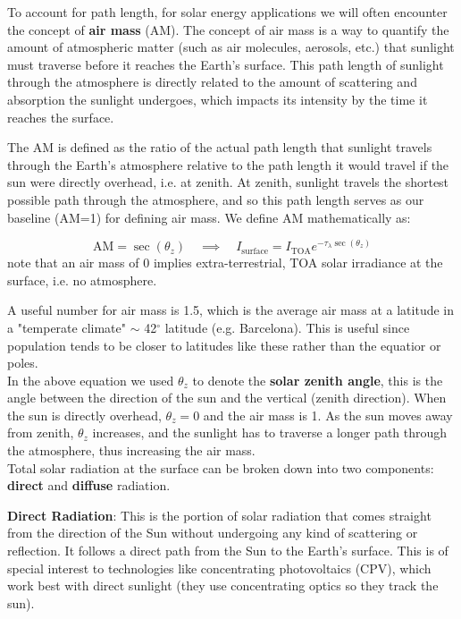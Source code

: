 \noindent To account for path length, for solar energy applications we will often
encounter the concept of \textbf{air mass} (AM). The concept of air mass is a way to
quantify the amount of atmospheric matter (such as air molecules, aerosols, etc.)
that sunlight must traverse before it reaches the Earth's surface.
This path length of sunlight through the atmosphere is directly related to the 
amount of scattering and absorption the sunlight undergoes, which impacts its 
intensity by the time it reaches the surface.

The AM is defined as the ratio of the actual path length that sunlight travels 
through the Earth's atmosphere relative to the path length it would travel if 
the sun were directly overhead, i.e. at zenith. At zenith, sunlight travels the
shortest possible path through the atmosphere, and so this path length serves 
as our baseline (AM=1) for defining air mass. We define AM mathematically as:

$$
\boxed{
    \text{AM} = \sec (\theta_z) \quad \implies \quad I_{\text{surface}} =
    I_{\text{TOA}} e^{-\tau_\lambda \sec (\theta_z)}
}
$$
note that an air mass of 0 implies extra-terrestrial, \gls{TOA} solar irradiance
at the surface, i.e. no atmosphere.

\noindent A useful number for air mass is 1.5, which is the average air mass
at a latitude in a "temperate climate" $\sim$ 42$^\circ$ latitude (e.g. Barcelona).
This is useful since population tends to be closer to latitudes like these rather 
than the equatior or poles.\\

\noindent In the above equation we used $\theta_z$ to denote the \textbf{solar
zenith angle}, this is the angle between the direction of
the sun and the vertical (zenith direction). When the sun is directly overhead,
$\theta_z = 0$ and the air mass is 1. As the sun moves away from zenith, $\theta_z$
increases, and the sunlight has to traverse a longer path through the atmosphere,
thus increasing the air mass.\\

\noindent Total solar radiation at the surface can be broken down into two 
components: \textbf{direct} and \textbf{diffuse} radiation. 

\textbf{Direct Radiation}: This is the portion of solar radiation that comes 
straight from the direction of the Sun without undergoing any kind of scattering
or reflection. It follows a direct path from the Sun to the Earth's surface. 
This is of special interest to technologies like concentrating photovoltaics 
(CPV), which work best with direct sunlight (they use concentrating optics so
they track the sun).

